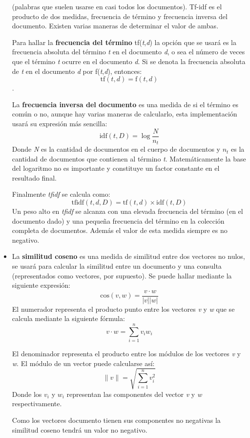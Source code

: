 \documentclass{article}
\begin{document}
\begin{itemize}
(palabras que suelen usarse en casi todos los documentos). Tf-idf es el producto de dos medidas, frecuencia de término y frecuencia inversa del documento. Existen varias maneras de determinar el valor de ambas. 

Para hallar la \textbf{frecuencia del término} tf(\textit{t},\textit{d}) la opción que se usará es la frecuencia absoluta del término \textit{t} en el documento \textit{d}, o sea el número de veces que el término \textit{t} ocurre en el documento \textit{d}. Si se denota la frecuencia absoluta de \textit{t} en el documento \textit{d} por f(\textit{t},\textit{d}), entonces:
\begin{equation}
\text{tf}(t,d) = \text{f}(t,d) 
\end{equation}.

La \textbf{frecuencia inversa del documento} es una medida de si el término es común o no, aunque hay varias maneras de calcularlo, esta implementación usará su expresión más sencilla:
\begin{equation}
\text{idf}(t,D) = \log \frac{N}{n_t} 
\end{equation}
Donde \textit{N} es la cantidad de documentos en el cuerpo de documentos y \textit{$n_t$} es la cantidad de documentos que contienen al término \textit{t}. Matemáticamente la base del logaritmo no es importante y constituye un factor constante en el resultado final.

Finalmente \textit{tfidf} se calcula como:
\begin{equation}
\text{tfidf}(t,d,D) = \text{tf}(t,d) \times \text{idf}(t,D) 
\end{equation} 
Un peso alto en \textit{tfidf} se alcanza con una elevada frecuencia del término (en el documento dado) y una pequeña frecuencia del término en la colección completa de documentos. Además el valor de esta medida siempre es no negativo.
\item La \textbf{similitud coseno} es una medida de similitud entre dos vectores no nulos, se usará para calcular la similitud entre un documento y una consulta (representados como vectores, por supuesto). Se puede hallar mediante la siguiente expresión:
\begin{equation}
 \text{cos}(v,w) = \frac{v \cdot w}{|v| |w|} 
\end{equation}
El numerador representa el producto punto entre los vectores \textit{v} y \textit{w} que se calcula mediante la siguiente fórmula:
\begin{equation}
v \cdot w = \sum_{i=1}^n v_i w_i
\end{equation} 
 
El denominador representa el producto entre los módulos de los vectores \textit{v} y \textit{w}. El módulo de un vector puede calcularse así:
\begin{equation}
\|v\| = \sqrt{\sum_{i=1}^n v_i^2}
\end{equation}
Donde los $v_{i}$ y $w_i$ representan las componentes del vector \textit{v} y \textit{w} respectivamente.

Como los vectores documento tienen sus componentes no negativas la similitud coseno tendrá un valor no negativo. 
\end{itemize}  
\end{document}
